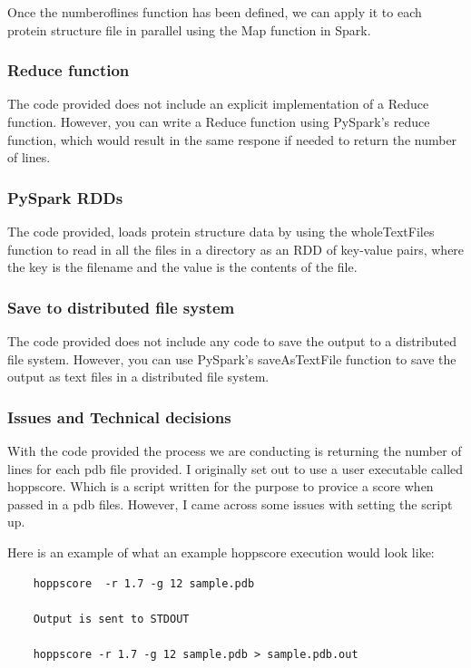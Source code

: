 \documentclass[]{final_report}
\begin{document}
Once the numberoflines function has been defined, we can apply it to each protein structure file in parallel using the Map function in Spark.


\subsubsection{Reduce function}
The code provided does not include an explicit implementation of a Reduce function. However, you can write a Reduce function using PySpark's reduce function, which would result in the same respone if needed to return the number of lines.


\subsubsection{PySpark RDDs}
The code provided, loads protein structure data by using the wholeTextFiles function to read in all the files in a directory as an RDD of key-value pairs, where the key is the filename and the value is the contents of the file.

\subsubsection{Save to distributed file system}
The code provided does not include any code to save the output to a distributed file system. However, you can use PySpark's saveAsTextFile function to save the output as text files in a distributed file system.
\clearpage

\subsubsection{Issues and Technical decisions}

With the code provided the process we are conducting is returning the number of lines for each pdb file provided. I originally set out to use a user executable called hoppscore. Which is a script written for the purpose to provice a score when passed in a pdb files. However, I came across some issues with setting the script up.

Here is an example of what an example hoppscore execution would look like:

\begin{lstlisting}
    hoppscore  -r 1.7 -g 12 sample.pdb 

    Output is sent to STDOUT

    hoppscore -r 1.7 -g 12 sample.pdb > sample.pdb.out
\end{lstlisting}
\end{document}
